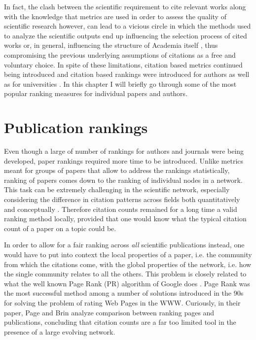 In fact, the clash between the scientific requirement to cite relevant works along with the knowledge that metrics are used in order to assess
the quality of scientific research however, can lead to a vicious circle
in which the methods used to analyze the scientific outputs end up influencing the selection process of cited works \cite{HARGENS1990205}  or, in general, influencing the structure of 
Academia itself \cite{10.2307/765143}, thus compromising the previous underlying assumptions
of citations as a free and voluntary choice. In spite of these limitations, citation based metrics continued being introduced and citation based
rankings were introduced for authors \cite{10.2307/4152261} as well as for universities \cite{RankingUni}. In this chapter I will briefly go
through some of the most popular ranking measures for individual papers and authors.





\section{Publication rankings}
Even though a large of number of rankings for authors and journals were being developed, paper rankings required more time to be introduced.
Unlike metrics meant for groups of papers that allow to address the rankings statistically, ranking of papers comes down to the ranking
of individual nodes in a network. This task can be extremely challenging in the scientific network, especially considering
the difference in citation patterns across fields both quantitatively \cite{Radicchi11112008} and conceptually \cite{Franceschet2010}. Therefore
citation counts remained for a long time a valid ranking method locally, provided that one would know what the typical citation count
of a paper on a topic could be. 

In order to allow for a fair ranking across \textit{all} scientific publications instead, one would have to put into context the local properties of a paper, i.e.
 the community from which the citations come, with the global properties of the network, i.e. how the single community relates to all the others. This problem
 is closely related to what the well known Page Rank (PR) algorithm of Google does \cite{Page99thepagerank}. Page Rank was the most successful method among a number
 of solutions introduced in the 90s \cite{Kleinberg1999} for solving the problem of rating Web Pages in the WWW. Curiously, in their paper,
 Page and Brin analyze comparison between ranking pages and publications, concluding that citation counts are a far too limited tool in the presence
 of a large evolving network.
 
